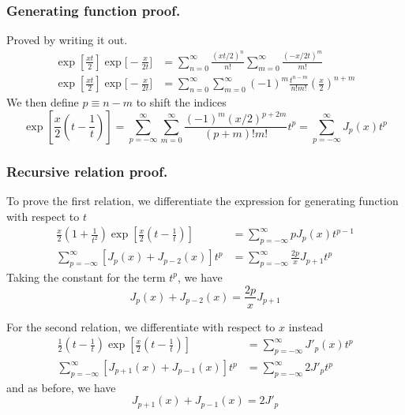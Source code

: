 \documentclass[../main.tex]{subfiles}
\begin{document}
\subsubsection*{Generating function proof.} Proved by writing it out.
\begin{align*}
    \exp\left[\frac{xt}{2}\right] \exp\bigg[-\frac{x}{2t}\bigg]&=\sum_{n=0}^{\infty}\frac{(xt/2)^n}{n!}\sum_{m=0}^{\infty} \frac{(-x/2t)^m}{m!}\\
    \exp\left[\frac{xt}{2}\right] \exp\bigg[-\frac{x}{2t}\bigg]&=\sum_{n=0}^{\infty}\sum_{m=0}^{\infty}(-1)^m\frac{t^{n-m}}{n!m!}\left(\frac{x}{2}\right)^{n+m}
\end{align*}
We then define $p\equiv n-m$ to shift the indices
\begin{equation*}
    \exp\left[\frac{x}{2}\left(t-\frac{1}{t}\right)\right]= \sum_{p=-\infty}^{\infty}\sum_{m=0}^{\infty}\frac{(-1)^m(x/2)^{p+2m}}{(p+m)!m!}t^p=\sum_{p=-\infty}^{\infty}J_p(x)t^p
\end{equation*}

\subsubsection*{Recursive relation proof.} To prove the first relation, we differentiate the expression for generating function with respect to $t$
\begin{align*}
    \frac{x}{2}\left(1+\frac{1}{t^2}\right)\exp\left[\frac{x}{2}\left(t-\frac{1}{t}\right)\right]&=\sum_{p=-\infty}^{\infty}pJ_p(x)t^{p-1}\\
    \sum_{p=-\infty}^{\infty}\left[J_p(x)+J_{p-2}(x)\right]t^p&= \sum_{p=-\infty}^{\infty}\frac{2p}{x}J_{p+1}t^{p}
\end{align*}
Taking the constant for the term $t^p$, we have 
\begin{equation*}
    J_p(x)+J_{p-2}(x)=\frac{2p}{x}J_{p+1} 
\end{equation*}

For the second relation, we differentiate with respect to $x$ instead 
\begin{align*}
    \frac{1}{2}\left(t-\frac{1}{t}\right)\exp\left[\frac{x}{2}\left(t-\frac{1}{t}\right)\right]&=\sum_{p=-\infty}^{\infty}J'_p(x)t^{p}\\
    \sum_{p=-\infty}^{\infty}\left[J_{p+1}(x)+J_{p-1}(x)\right]t^p&= \sum_{p=-\infty}^{\infty}2J'_pt^{p}
\end{align*}
and as before, we have 
\begin{equation*}
    J_{p+1}(x)+J_{p-1}(x)=2J'_p
\end{equation*}
\end{document}
